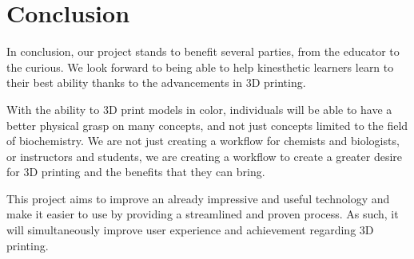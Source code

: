 \documentclass[letterpaper, onecolumn, draftclsnofoot, 10pt, compsoc]{IEEEtran}
\begin{document}
\section{Conclusion}
    \begin{singlespace}
        In conclusion, our project stands to benefit several parties, from the educator to the curious. We look forward to being able to help kinesthetic learners learn to their best ability thanks to the advancements in 3D printing.\par
        With the ability to 3D print models in color, individuals will be able to have a better physical grasp on many concepts, and not just concepts limited to the field of biochemistry. We are not just creating a workflow for chemists and biologists, or instructors and students, we are creating a workflow to create a greater desire for 3D printing and the benefits that they can bring.\par
        This project aims to improve an already impressive and useful technology and make it easier to use by providing a streamlined and proven process. As such, it will simultaneously improve user experience and achievement regarding 3D printing.\par
    \end{singlespace}

{}

\end{document}
